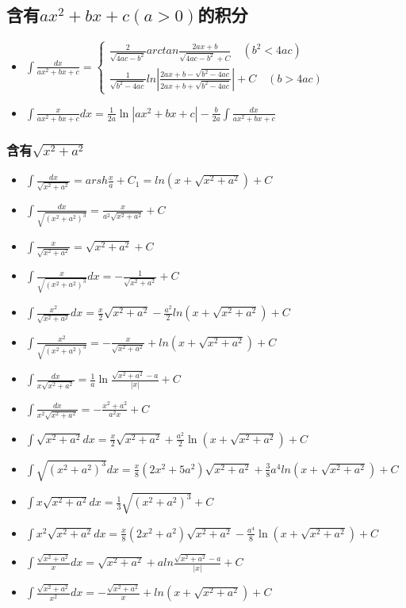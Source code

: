 \subsection{含有$ax^2+bx+c(a>0)$的积分}
\begin{itemize}
\item $\int\frac{dx}{ax^2+bx+c}=\begin{cases}\frac{2}{\sqrt{4ac-b^2}}arctan\frac{2ax+b}{\sqrt{4ac-b^2}+C}\quad (b^2<4ac)\\\frac{1}{\sqrt{b^2-4ac}}ln|\frac{2ax+b-\sqrt{b^2-4ac}}{2ax+b+\sqrt{b^2-4ac}}|+C\quad (b>4ac)\end{cases}$
\item $\int\frac{x}{ax^2+bx+c}dx=\frac{1}{2a}\ln|ax^2+bx+c|-\frac{b}{2a}\int\frac{dx}{ax^2+bx+c}$
\end{itemize}
\subsubsection{含有$\sqrt{x^2+a^2}$}
\begin{itemize}
	\item $\int \frac{dx}{\sqrt{x^2+a^2}}=arsh\frac{x}{a}+C_1=ln(x+\sqrt{x^2+a^2})+C$
	\item $\int \frac{dx}{\sqrt{(x^2+a^2)^3}}=\frac{x}{a^2\sqrt{x^2+a^2}}+C$
	\item $\int \frac{x}{\sqrt{x^2+a^2}}=\sqrt{x^2+a^2}+C$
	\item $\int\frac{x}{\sqrt{(x^2+a^2)^3}}dx=-\frac{1}{\sqrt{x^2+a^2}}+C$
	\item $\int\frac{x^2}{\sqrt{x^2+a^2}}dx=\frac{x}{2}\sqrt{x^2+a^2}-\frac{a^2}{2}ln\left(x+\sqrt{x^2+a^2}\right)+C$
	\item $\int \frac{x^2}{\sqrt{\left(x^2+a^2\right)^3}}=-\frac{x}{\sqrt{x^2+a^2}}+ln\left(x+\sqrt{x^2+a^2}\right)+C$
	\item $\int\frac{dx}{x\sqrt{x^2+a^2}}=\frac{1}{a}\ln\frac{\sqrt{x^2+a^2}-a}{|x|}+C$
	\item $\int\frac{dx}{x^2\sqrt{x^2+a^2}}=-\frac{x^2+a^2}{a^2x}+C$
	\item $\int\sqrt{x^2+a^2}dx=\frac{x}{2}\sqrt{x^2+a^2}+\frac{a^2}{2}\ln(x+\sqrt{x^2+a^2})+C$
	\item $\int \sqrt{\left(x^2+a^2\right)^3}dx=\frac{x}{8}(2x^2+5a^2)\sqrt{x^2+a^2}+\frac{3}{8}a^4ln(x+\sqrt{x^2+a^2})+C$
	\item $\int x\sqrt{x^2+a^2}dx=\frac{1}{3}\sqrt{\left(x^2+a^2\right)^3}+C$
	\item $\int x^2\sqrt{x^2+a^2}dx=\frac{x}{8}(2x^2+a^2)\sqrt{x^2+a^2}-\frac{a^4}{8}\ln(x+\sqrt{x^2+a^2})+C$
	\item $\int\frac{\sqrt{x^2+a^2}}{x}dx=\sqrt{x^2+a^2}+aln\frac{\sqrt{x^2+a^2}-a}{|x|}+C$
	\item $\int\frac{\sqrt{x^2+a^2}}{x^2}dx=-\frac{\sqrt{x^2+a^2}}{x}+ln(x+\sqrt{x^2+a^2})+C$
\end{itemize}
